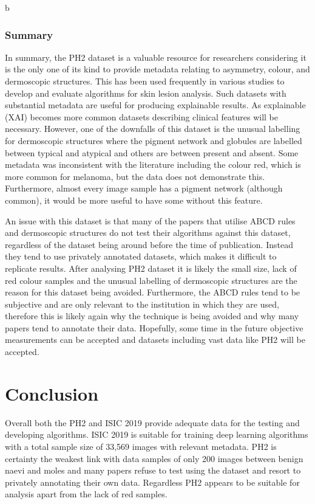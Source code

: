 \begin{figure}
	\centering
	\caption{}
\end{figure}\label{ph2-image-assessment}
b

\subsubsection{Summary}
In summary, the PH2 dataset is a valuable resource for researchers considering it is the only one of its kind to provide metadata relating to asymmetry, colour, and dermoscopic structures. This has been used frequently in various studies to develop and evaluate algorithms for skin lesion analysis. Such datasets with substantial metadata are useful for producing explainable results. As explainable (XAI) becomes more common datasets describing clinical features will be necessary. However, one of the downfalls of this dataset is the unusual labelling for dermoscopic structures where the pigment network and globules are labelled between typical and atypical and others are between present and absent. Some metadata was inconsistent with the literature including the colour red, which is more common for melanoma, but the data does not demonstrate this. Furthermore, almost every image sample has a pigment network (although common), it would be more useful to have some without this feature.

An issue with this dataset is that many of the papers that utilise ABCD rules and dermoscopic structures do not test their algorithms against this dataset, regardless of the dataset being around before the time of publication\cite{Kasmi2016, She2007, Tenenhaus2010, Ramezani2014, Zaqout2016}. Instead they tend to use privately annotated datasets, which makes it difficult to replicate results. After analysing PH2 dataset it is likely the small size, lack of red colour samples and the unusual labelling of dermoscopic structures are the reason for this dataset being avoided. Furthermore, the ABCD rules tend to be subjective and are only relevant to the institution in which they are used, therefore this is likely again why the technique is being avoided and why many papers tend to annotate their data. Hopefully, some time in the future objective measurements can be accepted and datasets including vast data like PH2 will be accepted.

\section{Conclusion}
Overall both the PH2 and ISIC 2019 provide adequate data for the testing and developing algorithms. ISIC 2019 is suitable for training deep learning algorithms with a total sample size of 33,569 images with relevant metadata. PH2 is certainty the weakest link with data samples of only 200 images between benign naevi and moles and many papers refuse to test using the dataset and resort to privately annotating their
own data. Regardless PH2 appears to be suitable for analysis apart from the lack of red samples.

